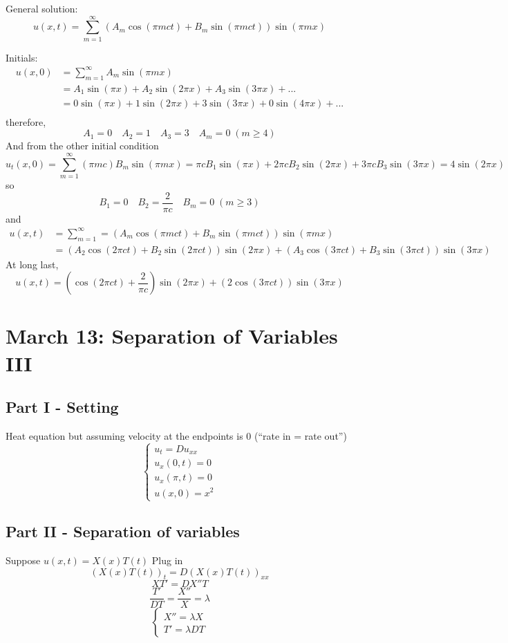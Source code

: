 \documentclass[12pt]{article}
\begin{document}
General solution:
\[u(x, t) = \sum_{m=1}^\infty (A_m\cos(\pi m ct) + B_m\sin(\pi mct)) \sin(\pi m x)\]

Initials:
\begin{align*}
    u(x, 0) &= \sum_{m=1}^\infty A_m \sin(\pi m x)\\
    &= A_1\sin(\pi x) + A_2\sin(2\pi x) + A_3\sin(3\pi x) + ...\\
    &= 0\sin(\pi x) + 1\sin(2\pi x) + 3\sin(3\pi x) + 0\sin(4\pi x)+ ...\\
\end{align*}
therefore, 
\[A_1 = 0 \quad A_2 = 1 \quad A_3 = 3 \quad A_m = 0 \; (m \geq 4)\]
And from the other initial condition
\[u_t(x, 0) = \sum_{m=1}^\infty (\pi mc)B_m\sin(\pi mx) = \pi cB_1 \sin(\pi x) + 2\pi cB_2\sin(2\pi x) + 3\pi cB_3\sin(3\pi x) = 4\sin(2\pi x)\]
so 
\[B_1 = 0 \quad B_2 = \frac{2}{\pi c} \quad B_m = 0 \; (m \geq 3)\]
and 
\begin{align*}
    u(x, t) &= \sum_{m=1}^\infty =(A_m\cos(\pi m ct) + B_m\sin(\pi mct)) \sin(\pi m x) \\
    &= (A_2\cos(2\pi ct) + B_2\sin(2\pi ct)) \sin(2\pi x) + (A_3\cos(3\pi ct) + B_3\sin(3\pi ct)) \sin(3\pi x)
\end{align*}
At long last,
\[\boxed{u(x, t) = \left(\cos(2\pi ct) + \frac{2}{\pi c}\right)\sin(2\pi x) + (2\cos(3\pi ct))\sin(3\pi x)}\]

\section{March 13: Separation of Variables III}
\subsection*{Part I - Setting}
Heat equation but assuming velocity at the endpoints is 0 (``rate in = rate out'')
\[\begin{cases}
    u_t = Du_{xx}\\
    u_x(0, t) = 0\\
    u_x(\pi, t) = 0\\
    u(x, 0) = x^2
\end{cases}\]

\subsection*{Part II - Separation of variables}
Suppose $u(x, t) = X(x)T(t)$
Plug in 
\[(X(x)T(t))_t = D(X(x)T(t))_{xx} \]
\[XT' = DX''T\]
\[\frac{T'}{DT} = \frac{X''}{X} = \lambda\]
\[\begin{cases}
    X'' = \lambda X\\
    T' = \lambda DT
\end{cases}\]
\end{document}
